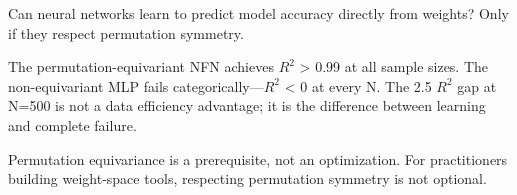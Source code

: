 
Can neural networks learn to predict model accuracy directly from weights? Only if they respect permutation symmetry.

The permutation-equivariant NFN achieves $R^2$ > 0.99 at all sample sizes. The non-equivariant MLP fails categorically---$R^2$ < 0 at every N. The 2.5 $R^2$ gap at N=500 is not a data efficiency advantage; it is the difference between learning and complete failure.

Permutation equivariance is a prerequisite, not an optimization. For practitioners building weight-space tools, respecting permutation symmetry is not optional.
